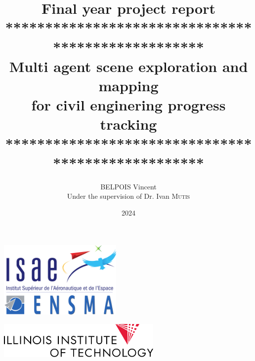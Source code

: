\documentclass[11pt]{article}
\title{Final year project report\vspace{10pt}\\**************************************************\\Multi agent scene exploration and mapping \\
for civil enginering progress tracking\vspace{10pt} \\**************************************************}
\author{BELPOIS Vincent \\ Under the supervision of Dr. Ivan \textsc{Mutis}}
\begin{document}
\date{2024}
\maketitle
\thispagestyle{empty}

\vspace{10mm}

    \begin{center}
    \includegraphics[width = 6cm]{Images/logo_ensma.png}
    \end{center}
    \vspace{2cm}
    \begin{center}
        \includegraphics[width = 8cm]{Images/IIT_Logo_stack_186_blk.png}
    \end{center}
    \newpage
    \thispagestyle{empty}
    \mbox{}
    
    

    
\end{document}
